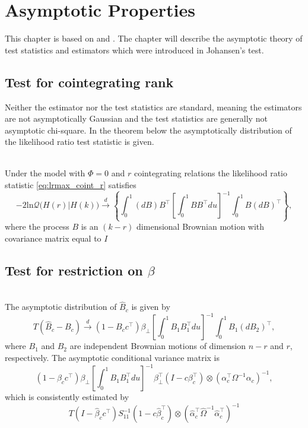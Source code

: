 \chapter{Asymptotic Properties}
This chapter is based on \cite{Statistica_analysis_of_cointegrating_vectors} and \cite{Modelling_of_cointegration_in_the_vector_autoregressive_model}. The chapter will describe the asymptotic theory of test statistics and estimators which were introduced in Johansen's test.

\section{Test for cointegrating rank}
Neither the estimator nor the test statistics are standard, meaning the estimators are not asymptotically Gaussian and the test statistics are generally not asymptotic chi-square. In the theorem below the asymptotically distribution of the likelihood ratio test statistic is given.

\begin{thm}\phantom\\
    Under the model with $\Phi=0$ and $r$ cointegrating relations the likelihood ratio statistic \eqref{eq:lrmax_coint_r} satisfies
    \begin{equation*}
        -2 \text{ln}\mathcal{Q} \big( H(r)|H(k) \big) \overset{d}{\rightarrow} \left\{ \int_0^1 (dB)B^{\top} \left[\int_0^1 BB^\top du \right]^{-1} \int_0^1 B(dB)^\top \right\},
    \end{equation*}
    where the process $B$ is an $(k-r)$ dimensional Brownian motion with covariance matrix equal to $I$
\end{thm}



\section{Test for restriction on $\beta$}
\begin{thm}\phantom\\
The asymptotic distribution of $\hat{B}_c$ is given by 
\begin{equation*}
    T(\hat{B}_c-B_c) \overset{d}{\rightarrow} (1-B_c c^\top) \beta_\perp \left[ \int_0^1 B_1 B_1^\top du \right]^{-1} \int_0^1 B_1(dB_2)^\top,
\end{equation*}
    where $B_1$ and $B_2$ are independent Brownian motions of dimension $n-r$ and $r$, respectively. The asymptotic conditional variance matrix is 
    \begin{equation*}
        (1-\beta_c c^\top) \beta_\perp \left[\int_0^1 B_1B_1^\top du \right]^{-1} \beta_\perp^\top (I-c\beta_c^\top ) \otimes (\alpha_c^\top \Omega^{-1}\alpha_c)^{-1},
    \end{equation*}
    which is consistently estimated by
    \begin{equation*}
        T(I-\hat{\beta}_c c^\top)S_{11}^{-1}(1-c\hat{\beta}_c^\top) \otimes (\hat{\alpha}_c^\top \hat{\Omega}^{-1}\hat{\alpha}_c^\top)^{-1}
    \end{equation*}
\end{thm}
